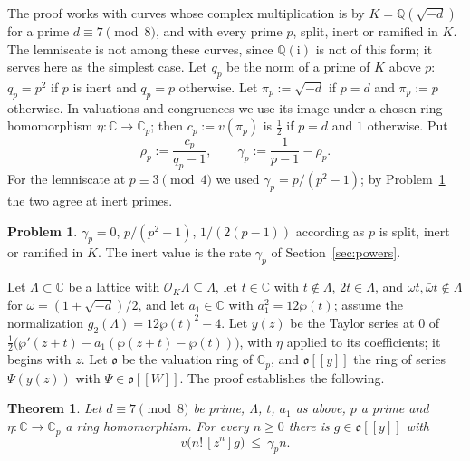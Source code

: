 \documentclass[reqno]{amsart}
\theoremstyle{definition}
\newtheorem{problem}{Problem}[section]
\theoremstyle{plain}
\newtheorem{theorem}{Theorem}[section]
\newcommand{\Q}{\mathbb{Q}}
\newcommand{\C}{\mathbb{C}}
\newcommand{\ii}{\mathrm{i}}
\newcommand{\Oc}{\mathcal{O}}
\begin{document}
The proof works with curves whose complex multiplication is by \(K = \Q(\sqrt{-d})\) for a prime \(d \equiv 7 \pmod 8\), and with every prime \(p\), split, inert or ramified in \(K\).  The lemniscate is not among these curves, since \(\Q(\ii)\) is not of this form; it serves here as the simplest case.  Let \(q_p\) be the norm of a prime of \(K\) above \(p\): \(q_p = p^2\) if \(p\) is inert and \(q_p = p\) otherwise.  Let \(\pi_p := \sqrt{-d}\) if \(p = d\) and \(\pi_p := p\) otherwise.  In valuations and congruences we use its image under a chosen ring homomorphism \(\eta \colon \C \to \C_p\); then \(c_p := v(\pi_p)\) is \(\tfrac12\) if \(p = d\) and \(1\) otherwise.  Put
\[
  \rho_p := \frac{c_p}{q_p - 1}, \qquad \gamma_p := \frac{1}{p-1} - \rho_p .
\]
For the lemniscate at \(p \equiv 3 \pmod 4\) we used \(\gamma_p = p/(p^2-1)\); by Problem~\ref{pr:gamma-cases} the two agree at inert primes.

\begin{problem}\label{pr:gamma-cases}
\(\gamma_p = 0\), \(p/(p^2-1)\), \(1/(2(p-1))\) according as \(p\) is split, inert or ramified in \(K\).  The inert value is the rate \(\gamma_p\) of Section~\ref{sec:powers}.
\end{problem}

Let \(\Lambda \subset \C\) be a lattice with \(\Oc_K\Lambda \subseteq \Lambda\), let \(t \in \C\) with \(t \notin \Lambda\), \(2t \in \Lambda\), and \(\omega t, \bar\omega t \notin \Lambda\) for \(\omega = (1 + \sqrt{-d})/2\), and let \(a_1 \in \C\) with \(a_1^2 = 12\wp(t)\); assume the normalization \(g_2(\Lambda) = 12\wp(t)^2 - 4\).  Let \(y(z)\) be the Taylor series at \(0\) of \(\tfrac12\bigl(\wp'(z + t) - a_1(\wp(z + t) - \wp(t))\bigr)\), with \(\eta\) applied to its coefficients; it begins with \(z\).  Let \(\mathfrak o\) be the valuation ring of \(\C_p\), and \(\mathfrak o[[y]]\) the ring of series \(\Psi(y(z))\) with \(\Psi \in \mathfrak o[[W]]\).  The proof establishes the following.

\begin{theorem}\label{thm:katz}
Let \(d \equiv 7 \pmod 8\) be prime, \(\Lambda\), \(t\), \(a_1\) as above, \(p\) a prime and \(\eta \colon \C \to \C_p\) a ring homomorphism.  For every \(n \ge 0\) there is \(g \in \mathfrak o[[y]]\) with
\[
  v\bigl(n!\,[z^n] g\bigr) \ \le\ \gamma_p n .
\]
\end{theorem}
\end{document}
